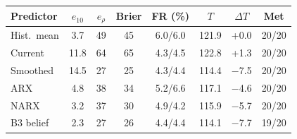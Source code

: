 \begin{tabular}{lccccccc}
\toprule
Predictor & $e_{10}$ & $e_\rho$ & Brier & FR (\%) & $T$ & $\Delta T$ & Met \\
\midrule
Hist.\ mean & 3.7 & 49 & 45 & 6.0/6.0 & 121.9 & +0.0 & 20/20 \\
Current & 11.8 & 64 & 65 & 4.3/4.5 & 122.8 & +1.3 & 20/20 \\
Smoothed & 14.5 & 27 & 25 & 4.3/4.4 & 114.4 & $-$7.5 & 20/20 \\
ARX & 4.8 & 38 & 34 & 5.2/6.6 & 117.1 & $-$4.6 & 20/20 \\
NARX & 3.2 & 37 & 30 & 4.9/4.2 & 115.9 & $-$5.7 & 20/20 \\
B3 belief & 2.3 & 27 & 26 & 4.4/4.4 & 114.1 & $-$7.7 & 19/20 \\
\bottomrule
\end{tabular}
